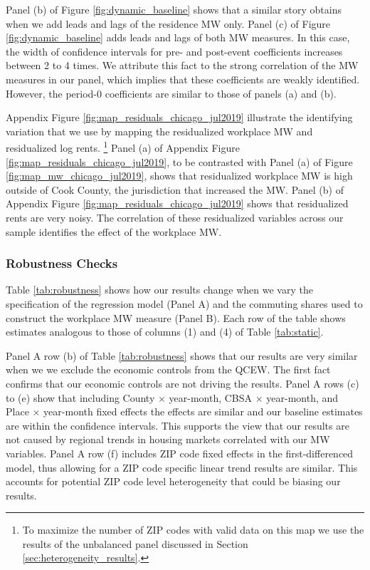 Panel (b) of Figure \ref{fig:dynamic_baseline} shows that a similar story 
obtains when we add leads and lags of the residence MW only.
Panel (c) of Figure \ref{fig:dynamic_baseline} adds leads and lags of both MW 
measures.
In this case, the width of confidence intervals for pre- and post-event 
coefficients increases between 2 to 4 times.
We attribute this fact to the strong correlation of the MW measures in our
panel, which implies that these coefficients are weakly identified.
However, the period-0 coefficients are similar to those of panels (a) and (b).

Appendix Figure \ref{fig:map_residuals_chicago_jul2019} illustrate the 
identifying variation that we use by mapping the residualized workplace MW and 
residualized log rents.%
\footnote{To maximize the number of ZIP codes with valid data on this map we
use the results of the unbalanced panel discussed in Section 
\ref{sec:heterogeneity_results}.}
Panel (a) of Appendix Figure \ref{fig:map_residuals_chicago_jul2019}, to be 
contrasted with Panel (a) of Figure \ref{fig:map_mw_chicago_jul2019}, 
shows that residualized workplace MW is high outside of Cook County, the 
jurisdiction that increased the MW.
Panel (b) of Appendix Figure \ref{fig:map_residuals_chicago_jul2019} shows 
that residualized rents are very noisy.
The correlation of these residualized variables across our sample identifies
the effect of the workplace MW.

\subsubsection*{Robustness Checks}

Table \ref{tab:robustness} shows how our results change when we vary the
specification of the regression model (Panel A) and the commuting shares used 
to construct the workplace MW measure (Panel B).
Each row of the table shows estimates analogous to those of columns (1) and (4)
of Table \ref{tab:static}.

Panel A row (b) of Table \ref{tab:robustness} shows that our results are very similar 
when we we exclude the economic controls from the QCEW. 
The first fact confirms that our economic controls are not driving the results.
Panel A rows (c) to (e) show that including County $\times$ year-month, 
CBSA $\times$ year-month, and Place $\times$ year-month fixed effects
the effects are similar and our baseline estimates are within the confidence 
intervals. This supports the view that our results are not caused by regional 
trends in housing markets correlated with our MW variables.
Panel A row (f) includes ZIP code fixed effects in the first-differenced model,
thus allowing for a ZIP code specific linear trend results are similar. This 
accounts for potential ZIP code level heterogeneity that could be biasing our results.


